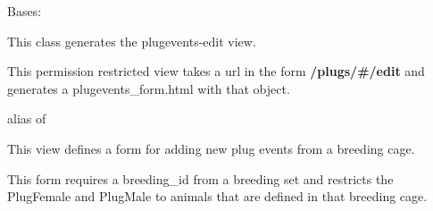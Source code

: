 \documentclass[letterpaper,10pt,english]{sphinxmanual}
\begin{document}
\begin{fulllineitems}
\label{api:mousedb.timed_mating.views.PlugEventsUpdate}
Bases: {\hyperref[api:mousedb.views.RestrictedUpdateView]{}}

This class generates the plugevents-edit view.

This permission restricted view takes a url in the form \textbf{/plugs/\#/edit} and generates a plugevents\_form.html with that object.

\begin{fulllineitems}
\label{api:mousedb.timed_mating.views.PlugEventsUpdate.context_object_name}
\end{fulllineitems}


\begin{fulllineitems}
\label{api:mousedb.timed_mating.views.PlugEventsUpdate.model}
alias of 

\end{fulllineitems}


\begin{fulllineitems}
\label{api:mousedb.timed_mating.views.PlugEventsUpdate.template_name}
\end{fulllineitems}


\end{fulllineitems}


\begin{fulllineitems}
\label{api:mousedb.timed_mating.views.breeding_plugevent}
This view defines a form for adding new plug events from a breeding cage.

This form requires a breeding\_id from a breeding set and restricts the PlugFemale and PlugMale to animals that are defined in that breeding cage.

\end{fulllineitems}
\end{document}

